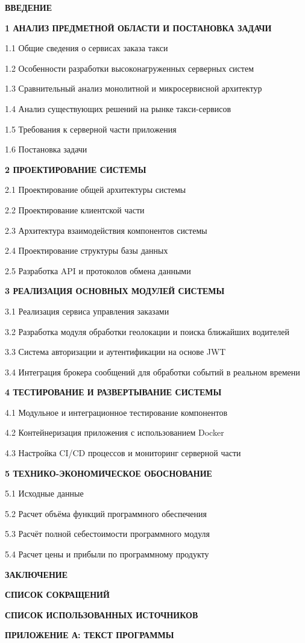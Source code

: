 \par {\bfseries ВВЕДЕНИЕ }
\par {\bfseries 1 АНАЛИЗ ПРЕДМЕТНОЙ ОБЛАСТИ И ПОСТАНОВКА ЗАДАЧИ }
\par 1.1 Общие сведения о сервисах заказа такси 
\par 1.2 Особенности разработки высоконагруженных серверных систем 
\par 1.3 Сравнительный анализ монолитной и микросервисной архитектур 
\par 1.4 Анализ существующих решений на рынке такси-сервисов 
\par 1.5 Требования к серверной части приложения 
\par 1.6 Постановка задачи 
\par {\bfseries 2 ПРОЕКТИРОВАНИЕ СИСТЕМЫ }
\par 2.1 Проектирование общей архитектуры системы 
\par 2.2 Проектирование клиентской части 
\par 2.3 Архитектура взаимодействия компонентов системы 
\par 2.4 Проектирование структуры базы данных 
\par 2.5 Разработка API и протоколов обмена данными 
\par {\bfseries 3 РЕАЛИЗАЦИЯ ОСНОВНЫХ МОДУЛЕЙ СИСТЕМЫ }
\par 3.1 Реализация сервиса управления заказами 
\par 3.2 Разработка модуля обработки геолокации и поиска ближайших водителей 
\par 3.3 Система авторизации и аутентификации на основе JWT 
\par 3.4 Интеграция брокера сообщений для обработки событий в реальном времени 
\par {\bfseries 4 ТЕСТИРОВАНИЕ И РАЗВЕРТЫВАНИЕ СИСТЕМЫ }
\par 4.1 Модульное и интеграционное тестирование компонентов 
\par 4.2 Контейнеризация приложения с использованием Docker 
\par 4.3 Настройка CI/CD процессов и мониторинг серверной части 
\par {\bfseries 5 ТЕХНИКО-ЭКОНОМИЧЕСКОЕ ОБОСНОВАНИЕ }
\par 5.1 Исходные данные 
\par 5.2 Расчет объёма функций программного обеспечения 
\par 5.3 Расчёт полной себестоимости программного модуля 
\par 5.4 Расчет цены и прибыли по программному продукту 
\par {\bfseries ЗАКЛЮЧЕНИЕ }
\par {\bfseries СПИСОК СОКРАЩЕНИЙ }
\par {\bfseries СПИСОК ИСПОЛЬЗОВАННЫХ ИСТОЧНИКОВ }
\par {\bfseries ПРИЛОЖЕНИЕ А: ТЕКСТ ПРОГРАММЫ}
